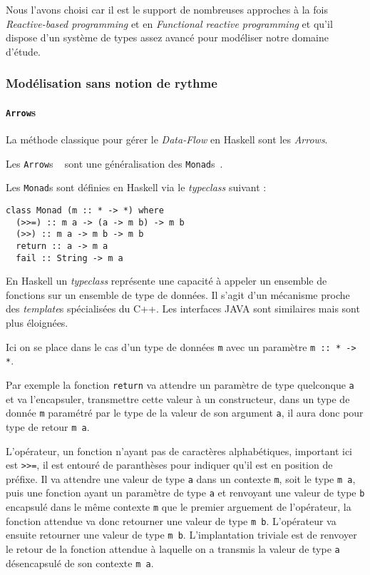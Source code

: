 \documentclass{llncs}
\newcommand{\DF}{\emph{Data-Flow} }
\newcommand{\RP}{\emph{Reactive-based programming} }
\newcommand{\FRP}{\emph{Functional reactive programming} }
\newcommand{\Arrs}{\lstinline{Arrow}s }
\begin{document}
Nous l'avons choisi car il est le support de nombreuses approches à la fois \RP
et en \FRP et qu'il dispose d'un système de types assez avancé pour modéliser
notre domaine d'étude.

\subsubsection{Modélisation sans notion de rythme}
\paragraph{\Arrs}
La méthode classique pour gérer le \DF en Haskell sont les \emph{Arrows}.

Les \Arrs~\cite{Hughes00} sont une généralisation des \lstinline{Monad}s~\cite{Wadler90}.

Les \lstinline{Monad}s sont définies en Haskell via le \emph{typeclass} suivant :
\begin{lstlisting}
class Monad (m :: * -> *) where
  (>>=) :: m a -> (a -> m b) -> m b
  (>>) :: m a -> m b -> m b
  return :: a -> m a
  fail :: String -> m a
\end{lstlisting}

En Haskell un \emph{typeclass} représente une capacité à appeler un ensemble
de fonctions sur un ensemble de type de données.
Il s'agit d'un mécanisme proche des \emph{template}s spécialisées du C++.
Les interfaces JAVA sont similaires mais sont plus éloignées.

Ici on se place dans le cas d'un type de données \lstinline{m} avec un paramètre
\lstinline{m :: * -> *}.

Par exemple la fonction \lstinline{return} va attendre un paramètre de type quelconque
\lstinline{a} et va l'encapsuler, transmettre cette valeur à un constructeur, dans
un type de donnée \lstinline{m} paramétré par le type de la valeur de son argument
\lstinline{a}, il aura donc pour type de retour \lstinline{m a}.

L'opérateur, un fonction n'ayant pas de caractères alphabétiques, important ici
est \lstinline{>>=}, il est entouré de paranthèses pour indiquer qu'il est en
position de préfixe.
Il va attendre une valeur de type \lstinline{a} dans un contexte \lstinline{m}, soit
le type \lstinline{m a}, puis une fonction ayant un paramètre de type \lstinline{a}
et renvoyant une valeur de type \lstinline{b} encapsulé dans le même contexte \lstinline{m}
que le premier arguement de l'opérateur, la fonction attendue va donc retourner
une valeur de type \lstinline{m b}. L'opérateur va ensuite retourner une valeur de
type \lstinline{m b}.
L'implantation triviale est de renvoyer le retour de la fonction attendue à
laquelle on a transmis la valeur de type \lstinline{a} désencapsulé de son contexte
\lstinline{m a}.
\end{document}
